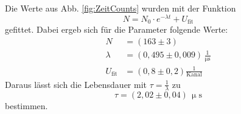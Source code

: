 Die Werte aus Abb. \ref{fig:ZeitCounts} wurden mit der Funktion
\begin{equation}
  N=N_0\cdot e^{-\lambda t}+U_{\text{fit}}
\end{equation}
gefittet.
Dabei ergeb sich für die Parameter folgende Werte:
\begin{align*}
  N&=(163 \pm 3)\\
  \lambda&=(0,495 \pm 0,009)\,\frac{1}{\upmu\text{s}}\\
  U_{\text{fit}}&=(0,8 \pm 0,2) \frac{1}{\text{Kanal}}
\end{align*}
Daraus lässt sich die Lebensdauer mit $\tau=\frac{1}{\lambda}$ zu
\begin{equation*}
  \tau=(2,02\pm0,04)\,\upmu\text{s}
\end{equation*}
bestimmen.
